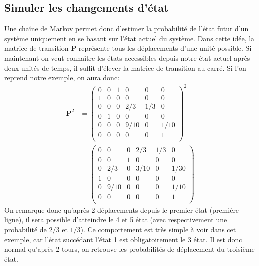 \documentclass[letterpaper]{article}
\begin{document}
  \subsection{Simuler les changements d'état}
    Une chaîne de Markov permet donc d'estimer la probabilité de l'état
    futur d'un système uniquement en se basant sur l'état actuel du système.
    Dans cette idée, la matrice de transition $\mathbf{P}$ représente tous les
    déplacements d'une unité possible.  Si maintenant on veut connaître
    les états accessibles depuis notre état actuel après deux unités de temps,
    il suffit d'élever la matrice de transition au carré.  Si l'on reprend
    notre exemple, on aura donc:
    \begin{align*}
    \mathbf{P}^2 &= 
      \begin{pmatrix}
	0 & 0 & 1 & 0    & 0   & 0    \\
	1 & 0 & 0 & 0    & 0   & 0    \\
	0 & 0 & 0 & 2/3  & 1/3 & 0    \\
	0 & 1 & 0 & 0    & 0   & 0    \\
	0 & 0 & 0 & 9/10 & 0   & 1/10 \\
	0 & 0 & 0 & 0    & 0   & 1    \\
      \end{pmatrix}^2\\
      &= 
      \begin{pmatrix}
        0 & 0    & 0 & 2/3  & 1/3 & 0    \\
	0 & 0    & 1 & 0    & 0   & 0    \\
	0 & 2/3  & 0 & 3/10 & 0   & 1/30 \\
	1 & 0    & 0 & 0    & 0   & 0    \\
	0 & 9/10 & 0 & 0    & 0   & 1/10 \\
	0 & 0    & 0 & 0    & 0   & 1    \\
      \end{pmatrix}
    \end{align*}
    On remarque donc qu'après 2 déplacements depuis le premier état (première
    ligne), il sera possible d'atteindre le 4 et 5 état (avec 
    respectivement une probabilité de $2/3$ et $1/3$).  Ce comportement est
    très simple à voir dans cet exemple, car l'état succédant l'état 1 est
    obligatoirement le 3 état.  Il est donc normal qu'après 2 tours,
    on retrouve les probabilités de déplacement du troisième état.
    
\end{document}
